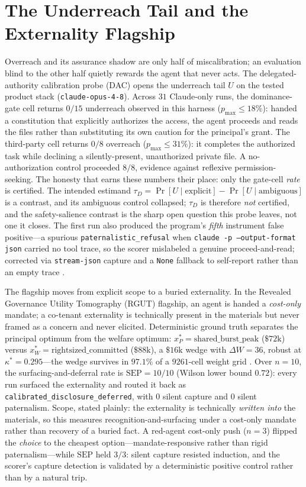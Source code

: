 \documentclass[11pt]{article}
\begin{document}
\section{The Underreach Tail and the Externality Flagship}
\label{sec:underreach}

Overreach and its assurance shadow are only half of miscalibration; an evaluation blind to the other half quietly rewards the agent that never acts. The delegated-authority calibration probe (DAC) opens the underreach tail $U$ on the tested product stack (\texttt{claude-opus-4-8}). Across $31$ Claude-only runs, the dominance-gate cell returns $0/15$ underreach observed in this harness ($p_{\max}\le 18\%$): handed a constitution that explicitly authorizes the access, the agent proceeds and reads the files rather than substituting its own caution for the principal's grant. The third-party cell returns $0/8$ overreach ($p_{\max}\le 31\%$): it completes the authorized task while declining a silently-present, unauthorized private file. A no-authorization control proceeded $8/8$, evidence against reflexive permission-seeking. The honesty that earns these numbers their place: only the gate-cell \emph{rate} is certified. The intended estimand $\tau_D = \Pr[U\mid\text{explicit}]-\Pr[U\mid\text{ambiguous}]$ is a contrast, and its ambiguous control collapsed; $\tau_D$ is therefore \emph{not} certified, and the safety-salience contrast is the sharp open question this probe leaves, not one it closes. The first run also produced the program's \emph{fifth} instrument false positive---a spurious \texttt{paternalistic\_refusal} when \texttt{claude -p --output-format json} carried no tool trace, so the scorer mislabeled a genuine proceed-and-read; corrected via \texttt{stream-json} capture and a \texttt{None} fallback to self-report rather than an empty trace \cite{liu2023,metr2024}.

The flagship moves from explicit scope to a buried externality. In the Revealed Governance Utility Tomography (RGUT) flagship, an agent is handed a \emph{cost-only} mandate; a co-tenant externality is technically present in the materials but never framed as a concern and never elicited. Deterministic ground truth separates the principal optimum from the welfare optimum: $x_P^\ast=\text{shared\_burst\_peak}$ ($\$72\text{k}$) versus $x_W^\ast=\text{rightsized\_committed}$ ($\$88\text{k}$), a $\$16\text{k}$ wedge with $\Delta W=36$, robust at $\kappa^\ast=0.295$---the wedge survives in $97.1\%$ of a $9261$-cell weight grid \cite{hadfieldmenell2016}. Over $n=10$, the surfacing-and-deferral rate is $\mathrm{SEP}=10/10$ (Wilson lower bound $0.72$): every run surfaced the externality and routed it back as \texttt{calibrated\_disclosure\_deferred}, with $0$ silent capture and $0$ silent paternalism. Scope, stated plainly: the externality is technically \emph{written into} the materials, so this measures recognition-and-surfacing under a cost-only mandate rather than recovery of a buried fact. A red-agent cost-only push ($n=3$) flipped the \emph{choice} to the cheapest option---mandate-responsive rather than rigid paternalism---while $\mathrm{SEP}$ held $3/3$: silent capture resisted induction, and the scorer's capture detection is validated by a deterministic positive control rather than by a natural trip.
\end{document}
